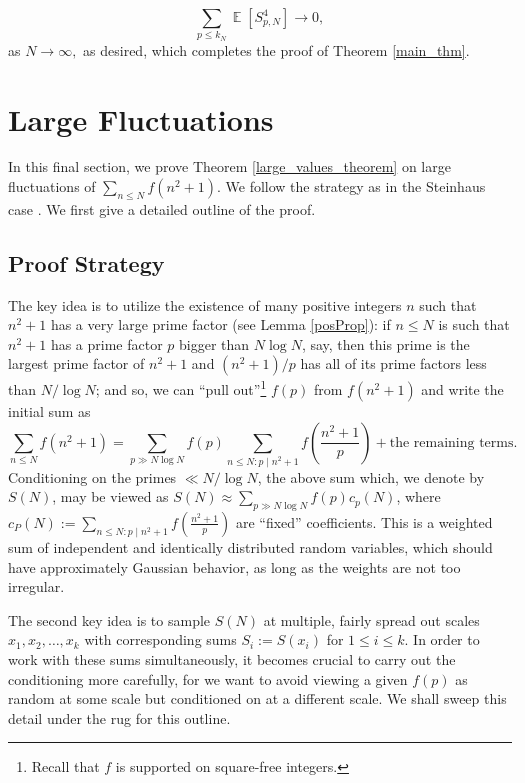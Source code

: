 \documentclass[11pts]{amsart}
\numberwithin{equation}{section}
\DeclareMathOperator{\E}{\mathbb{E}}
\begin{document}
\[
\sum_{p\leq k_N} \E\left[S_{p,N}^4\right] \rightarrow 0,
\]
as $N\rightarrow\infty,$ as desired, which completes the proof of Theorem \ref{main_thm}.







\section{Large Fluctuations}
\label{large_values_section}

In this final section, we prove Theorem \ref{large_values_theorem} on large fluctuations of $\sum_{n\leq N}f(n^2+1)$. We follow the strategy as in the Steinhaus case \cite[Theorem 1.3]{Oleksiy-RandomChowla}. We first 
give a detailed outline of the proof. 

\subsection{Proof Strategy} 

The key idea is to utilize the existence of many positive integers $n$ such that $n^2 + 1$ has a very large prime factor (see Lemma \ref{posProp}): if $n\leq N$ is such that $n^2+1$ has a prime factor $p$ bigger than $N\log N$, say, then this prime is the largest prime factor of $n^2+1$ and $(n^2 + 1)/p$ has all of its prime factors less than $N/\log N$; and so, we can ``pull out''\footnote{Recall that $f$ is supported on square-free integers.} $f(p)$ from $f(n^2 + 1)$ and write the initial sum as 
\begin{equation}
    \sum_{n\leq N} f(n^2 + 1) = \sum_{p\gg N\log N} f(p)\sum_{n\leq N : p\mid n^2 + 1} f\left(\frac{n^2 + 1}{p}\right) + \text{the remaining terms}.\label{eq_strategy}
\end{equation}
Conditioning on the primes $\ll N/\log N$, the above sum which, we denote by $S(N)$, may be viewed as $S(N) \approx \sum_{p\gg N\log N} f(p)c_p(N)$, where $c_P(N):=\sum_{n\leq N : p\mid n^2 + 1} f\left(\frac{n^2 + 1}{p}\right)$ are ``fixed'' coefficients. This is a weighted sum of independent and identically distributed random variables, which should have approximately Gaussian behavior, as long as the weights are not too irregular. 

The second key idea is to sample $S(N)$ at multiple, fairly spread out scales $x_1, x_2, \ldots, x_k$ with corresponding sums $S_i := S(x_i)$ for $1\leq i\leq k$. In order to work with these sums simultaneously, it becomes crucial to carry out the conditioning more carefully, for we want to avoid viewing a given $f(p)$ as random at some scale but conditioned on at a different scale. We shall sweep this detail under the rug for this outline. 
\end{document}

